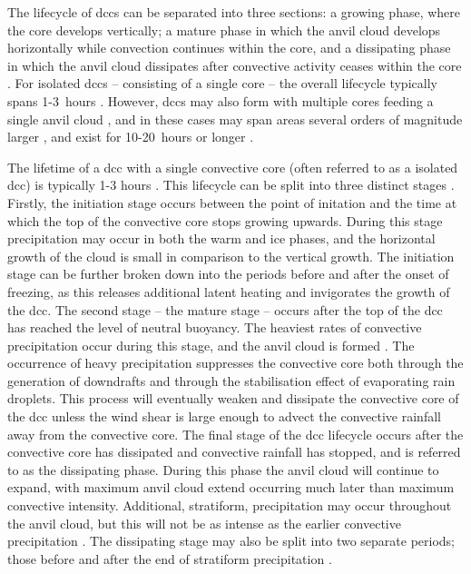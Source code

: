 The lifecycle of \acrshort{dcc}s can be separated into three sections: a growing phase, where the core develops vertically; a mature phase in which the anvil cloud develops horizontally while convection continues within the core, and a dissipating phase in which the anvil cloud dissipates after convective activity ceases within the core \citep{wall_life_2018}.
For isolated \acrshort{dcc}s -- consisting of a single core -- the overall lifecycle typically spans 1-3~hours \citep{chen_diurnal_1997}.
However, \acrshort{dcc}s may also form with multiple cores feeding a single anvil cloud \citep{roca_simple_2017}, and in these cases may span areas several orders of magnitude larger \citep{houze_mesoscale_2004}, and exist for 10-20~hours or longer \citep{chen_diurnal_1997}.

The lifetime of a \acrshort{dcc} with a single convective core (often referred to as a isolated \acrshort{dcc}) is typically 1-3 hours \citep{chen_diurnal_1997}.
This lifecycle can be split into three distinct stages \citep{wall_life_2018}.
Firstly, the initiation stage occurs between the point of initation and the time at which the top of the convective core stops growing upwards.
During this stage precipitation may occur in both the warm and ice phases, and the horizontal growth of the cloud is small in comparison to the vertical growth.
The initiation stage can be further broken down into the periods before and after the onset of freezing, as this releases additional latent heating and invigorates the growth of the \acrshort{dcc}.
The second stage -- the mature stage -- occurs after the top of the \acrshort{dcc} has reached the level of neutral buoyancy.
The heaviest rates of convective precipitation occur during this stage, and the anvil cloud is formed \citep{houze_chapter_2014}.
The occurrence of heavy precipitation suppresses the convective core both through the generation of downdrafts and through the stabilisation effect of evaporating rain droplets.
This process will eventually weaken and dissipate the convective core of the \acrshort{dcc} unless the wind shear is large enough to advect the convective rainfall away from the convective core.
The final stage of the \acrshort{dcc} lifecycle occurs after the convective core has dissipated and convective rainfall has stopped, and is referred to as the dissipating phase.
During this phase the anvil cloud will continue to expand, with maximum anvil cloud extend occurring much later than maximum convective intensity.
Additional, stratiform, precipitation may occur throughout the anvil cloud, but this will not be as intense as the earlier convective precipitation \citep{houze_chapter_2014}.
The dissipating stage may also be split into two separate periods; those before and after the end of stratiform precipitation \citep{wall_life_2018}.

